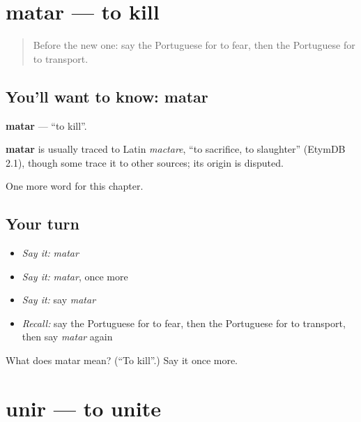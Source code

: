 \section[matar]{matar — to kill}

\label{lesson:PT-C144-matar}



\begin{quote}
Before the new one: say the Portuguese for to fear, then the Portuguese for to transport.
\end{quote}

\subsection*{You'll want to know: matar}
\textbf{matar} — \textquotedblleft{}to kill\textquotedblright{}.

\begin{cousinweb}
\textbf{matar} is usually traced to Latin \emph{mactare}, \textquotedblleft{}to sacrifice, to slaughter\textquotedblright{} (EtymDB 2.1), though some trace it to other sources; its origin is disputed.
\end{cousinweb}

\begin{grammarlens}[title={What you've built}]
One more word for this chapter.
\end{grammarlens}

\subsection*{Your turn}
\begin{itemize}
\raggedright
  \item \emph{Say it:} \emph{matar}
  \item \emph{Say it:} \emph{matar}, once more
  \item \emph{Say it:} say \emph{matar}
  \item \emph{Recall:} say the Portuguese for to fear, then the Portuguese for to transport, then say \emph{matar} again
\end{itemize}

\begin{tcolorbox}[breakable,colback=teal!4,colframe=teal!35!black,title={Before you move on}]
What does matar mean? (\textquotedblleft{}To kill\textquotedblright{}.) Say it once more.
\end{tcolorbox}
\section[unir]{unir — to unite}

